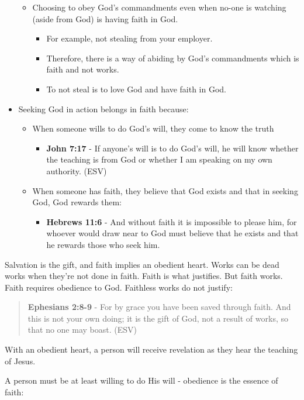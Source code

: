 \documentclass[11pt]{article}
\begin{document}
\begin{itemize}
\begin{itemize}
\item Choosing to obey God's commandments even when no-one is watching (aside from God) is having faith in God.
\begin{itemize}
\item For example, not stealing from your employer.
\item Therefore, there is a way of abiding by God's commandments which is faith and not works.
\item To not steal is to love God and have faith in God.
\end{itemize}
\end{itemize}
\item Seeking God in action belongs in faith because:
\begin{itemize}
\item When someone wills to do God's will, they come to know the truth
\begin{itemize}
\item \textbf{John 7:17} - If anyone's will is to do God's will, he will know whether the teaching is from God or whether I am speaking on my own authority. (ESV)
\end{itemize}
\item When someone has faith, they believe that God exists and that in seeking God, God rewards them:
\begin{itemize}
\item \textbf{Hebrews 11:6} - And without faith it is impossible to please him, for whoever would draw near to God must believe that he exists and that he rewards those who seek him.
\end{itemize}
\end{itemize}
\end{itemize}

Salvation is the gift, and faith implies an obedient heart. Works can be dead works when they're not done in faith. Faith is what justifies. But faith works. Faith requires obedience to God. Faithless works do not justify:

\begin{quote}
\textbf{Ephesians 2:8-9} - For by grace you have been saved through faith. And this is not your own doing; it is the gift of God, not a result of works, so that no one may boast. (ESV)
\end{quote}

With an obedient heart, a person will receive revelation as they hear the teaching of Jesus.

A person must be at least willing to do His will - obedience is the essence of faith:
\end{document}
